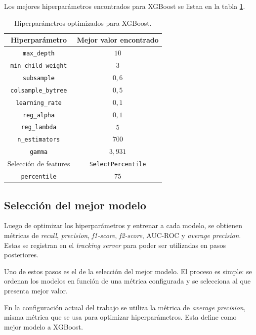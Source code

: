 Los mejores hiperparámetros encontrados para XGBoost se listan en la tabla \ref{tab:xgboost-hip}.

\begin{table}[H]
	\centering
	\caption[Hiperparámetros - XGBoost]{Hiperparámetros optimizados para XGBoost.}
	\begin{tabular}{c c}
		\toprule
		\textbf{Hiperparámetro} 	 & \textbf{Mejor valor encontrado} \\
		\midrule
        \texttt{max\_depth} & $10$ \\
        \texttt{min\_child\_weight} & $3$ \\
        \texttt{subsample} & $0,6$ \\
        \texttt{colsample\_bytree} & $0,5$ \\
        \texttt{learning\_rate} & $0,1$ \\
        \texttt{reg\_alpha} & $0,1$ \\
        \texttt{reg\_lambda} & $5$ \\
        \texttt{n\_estimators} & $700$ \\
        \texttt{gamma} & $3,931$ \\
        Selección de features & \texttt{SelectPercentile} \\
        \texttt{percentile} &  $75$ \\
		\bottomrule
		\hline
	\end{tabular}
	\label{tab:xgboost-hip}
\end{table}

\subsection{Selección del mejor modelo}

Luego de optimizar los hiperparámetros y entrenar a cada modelo, se obtienen métricas de \textit{recall}, \textit{precision}, \textit{f1-score}, \textit{f2-score}, AUC-ROC y \textit{average precision}. Estas se registran en el \textit{tracking server} para poder ser utilizadas en pasos posteriores.

Uno de estos pasos es el de la selección del mejor modelo. El proceso es simple: se ordenan los modelos en función de una métrica configurada y se selecciona al que presenta mejor valor.

En la configuración actual del trabajo se utiliza la métrica de \textit{average precision}, misma métrica que se usa para optimizar hiperparámetros. Esta define como mejor modelo a XGBoost.

